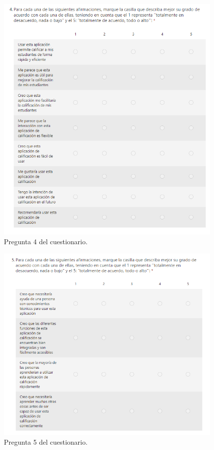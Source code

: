 \begin{figure}[h]
\centering\includegraphics[width=1\linewidth]{figs/pregunta_4.png}
\caption{Pregunta 4 del cuestionario.}
\label{Fig:pregunta_4}
\end{figure}

\begin{figure}[h]
\centering\includegraphics[width=1\linewidth]{figs/pregunta_5.png}
\caption{Pregunta 5 del cuestionario.}
\label{Fig:pregunta_5}
\end{figure}

